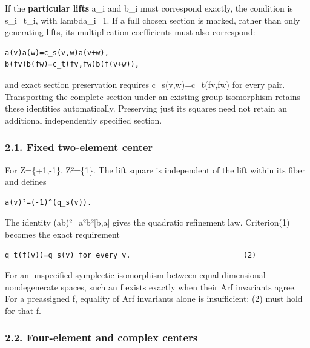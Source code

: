 If the \textbf{particular lifts} a\_i and b\_i must correspond exactly,
the condition is s\_i=t\_i, with lambda\_i=1. If a full chosen section
is marked, rather than only generating lifts, its multiplication
coefficients must also correspond:

\begin{Verbatim}[fontsize=\small,breaklines=true,breakanywhere=true]
a(v)a(w)=c_s(v,w)a(v+w),
b(fv)b(fw)=c_t(fv,fw)b(f(v+w)),
\end{Verbatim}

and exact section preservation requires c\_s(v,w)=c\_t(fv,fw) for every
pair. Transporting the complete section under an existing group
isomorphism retains these identities automatically. Preserving just its
squares need not retain an additional independently specified section.

\hypertarget{dyadic_markings-fixed-two-element-center}{%
\subsubsection{2.1. Fixed two-element
center}\label{dyadic_markings-fixed-two-element-center}}

For Z=\{+1,-1\}, Z²=\{1\}. The lift square is independent of the lift
within its fiber and defines

\begin{Verbatim}[fontsize=\small,breaklines=true,breakanywhere=true]
a(v)²=(-1)^(q_s(v)).
\end{Verbatim}

The identity (ab)²=a²b²{[}b,a{]} gives the quadratic refinement law.
Criterion(1) becomes the exact requirement

\begin{Verbatim}[fontsize=\small,breaklines=true,breakanywhere=true]
q_t(f(v))=q_s(v) for every v.                          (2)
\end{Verbatim}

For an unspecified symplectic isomorphism between equal-dimensional
nondegenerate spaces, such an f exists exactly when their Arf invariants
agree. For a preassigned f, equality of Arf invariants alone is
insufficient: (2) must hold for that f.

\hypertarget{dyadic_markings-four-element-and-complex-centers}{%
\subsubsection{2.2. Four-element and complex
centers}\label{dyadic_markings-four-element-and-complex-centers}}

